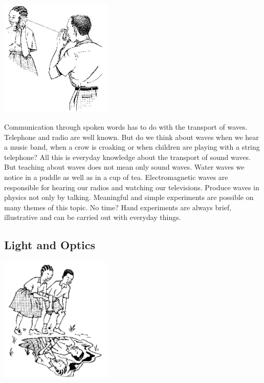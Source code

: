 \begin{multicols}{2}
\begin{center}
\includegraphics[width=0.4\textwidth]{./img/source/wave-motion.jpg}
\end{center}

Communication through spoken words has to do with the transport of waves. Telephone and
radio are well known. But do we think about waves when we hear a music band, when a crow
is croaking or when children are playing with a string telephone? All this is everyday knowledge about the transport of sound waves.\\

But teaching about waves does not mean only sound waves. Water waves we notice in a puddle as well as in a cup of tea. Electromagnetic waves are responsible for hearing our radios and watching our televisions.
Produce waves in physics not only by talking. Meaningful and simple experiments are
possible on many themes of this topic. No time? Hand experiments are always brief,
illustrative and can be carried out with everyday things.

\subsection{Light and Optics} 

\begin{center}
\includegraphics[width=0.4\textwidth]{./img/source/light-optics.png}
\end{center}


\end{multicols}
